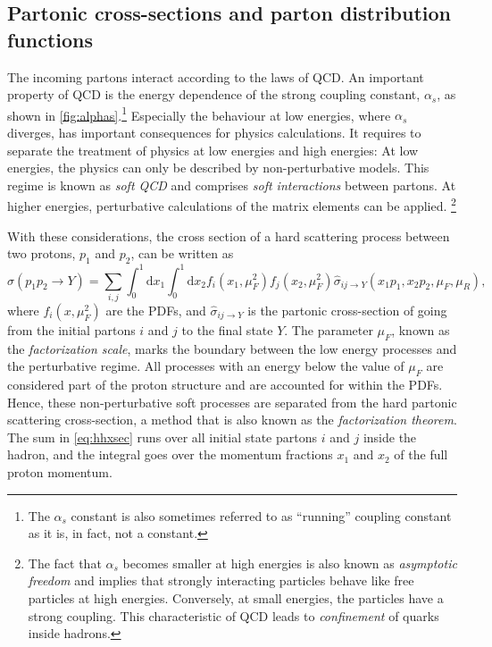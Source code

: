 \subsection{Partonic cross-sections and parton distribution functions}
The incoming partons interact according to the laws of QCD.
An important property of QCD is the energy dependence of the strong coupling constant, $\alpha_s$, as shown in \cref{fig:alphas}.\footnote{The $\alpha_s$ constant is also sometimes referred to as ``running'' coupling constant as it is, in fact, not a constant.} 
Especially the behaviour at low energies, where $\alpha_s$ diverges, has important consequences for physics calculations. It requires to separate the treatment of physics at low energies and high energies: At low energies, the physics can only be described by non-perturbative models. This regime is known as \emph{soft QCD} and comprises \emph{soft interactions} between partons.
At higher energies, perturbative calculations of the matrix elements can be applied. \footnote{The fact that $\alpha_s$ becomes smaller at high energies is also known as \emph{asymptotic freedom} and implies that strongly interacting particles behave like free particles at high energies. Conversely, at small energies, the particles have a strong coupling. This characteristic of QCD leads to \emph{confinement} of quarks inside hadrons.}

With these considerations, the cross section of a hard scattering process between two protons, $p_1$ and $p_2$, can be written as
\begin{equation}
  \sigma(p_1p_2 \to Y) = \sum_{i,j} \int_0^1 \mathrm{d}x_1 \int_0^1 \mathrm{d}x_2 f_i(x_1,\mu_F^2) f_j(x_2,\mu_F^2) \hat{\sigma}_{ij \rightarrow Y}(x_1p_1,x_2p_2,\mu_F,\mu_R), 
  \label{eq:hhxsec}
\end{equation}
where $f_i(x,\mu_F^2)$ are the PDFs, and $\hat{\sigma}_{ij \rightarrow Y}$ is the partonic cross-section of going from the initial partons $i$ and $j$ to the final state $Y$.
The parameter $\mu_F$, known as the \emph{factorization scale}, marks the boundary between the low energy processes and the perturbative regime. 
All processes with an energy below the value of $\mu_F$ are considered part of the proton structure and are accounted for within the PDFs. Hence, these non-perturbative soft processes are separated from the hard partonic scattering cross-section, a method that is also known as the \emph{factorization theorem}.
The sum in \cref{eq:hhxsec} runs over all initial state partons $i$ and $j$ inside the hadron, and the integral goes over the momentum fractions $x_1$ and $x_2$ of the full proton momentum.

